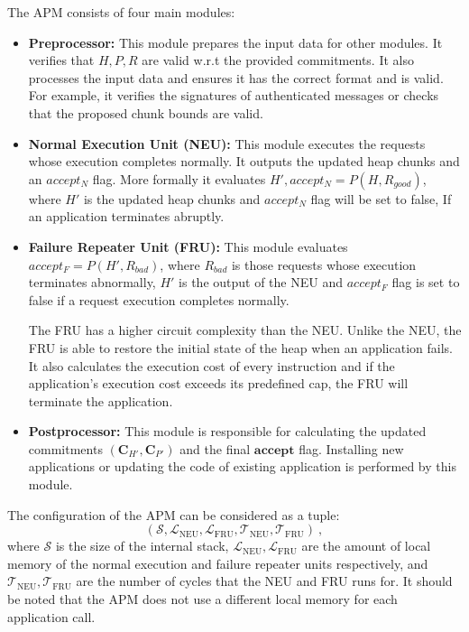 The APM consists of four main modules:
\begin{itemize}
    \item \textbf{Preprocessor:} This module prepares the input data for other modules. It verifies that $H,
    P,R$ are valid w.r.t the provided commitments. It also processes the input data and ensures it has the
    correct format and is valid. For example, it verifies the signatures of authenticated messages or
    checks that the proposed chunk bounds are valid.
    \item \textbf{Normal Execution Unit (NEU):} This module executes the requests whose execution completes
    normally. It outputs the updated heap chunks and an $accept_N$ flag. More formally it evaluates
    $H',accept_N=P(H,R_{good})$, where $H'$ is the updated heap chunks and $accept_N$ flag will be set to false, If an
    application terminates abruptly.
    \item \textbf{Failure Repeater Unit (FRU):} This module evaluates $accept_F=P(H',R_{bad})$, where $R_{bad}$ is
    those requests whose execution terminates abnormally, $H'$ is the output of the NEU and $accept_F$ flag is set
    to false if a request execution completes normally.

    The FRU has a higher circuit complexity than the NEU\@. Unlike the NEU, the FRU is able to restore the initial state
    of the heap when an application fails. It also calculates the execution cost of every instruction and if the
    application's execution cost exceeds its predefined cap, the FRU will terminate the application.
    \item \textbf{Postprocessor:} This module is responsible for calculating the updated commitments
    $(\mathbf{C}_{H'}, \mathbf{C}_{P'})$ and the final $\mathbf{accept}$ flag. Installing new applications or
    updating the code of existing application is performed by this module.
\end{itemize}


The configuration of the APM can be considered as a tuple:
\[
(\mathcal{S},\mathcal{L}_{\text{NEU}},\mathcal{L}_{\text{FRU}},\mathcal{T}_{\text{NEU}},
\mathcal{T}_{\text{FRU}})\ ,
\]
where $\mathcal{S}$ is the size of the internal stack, $\mathcal{L}_{\text{NEU}},\mathcal{L}_{\text{FRU}}$ are the
amount of local memory of the normal execution and failure repeater units respectively, and
$\mathcal{T}_{\text{NEU}},\mathcal{T}_{\text{FRU}}$ are the number of cycles that the NEU and FRU runs for. It should
be noted that the APM does not use a different local memory for each application call.

